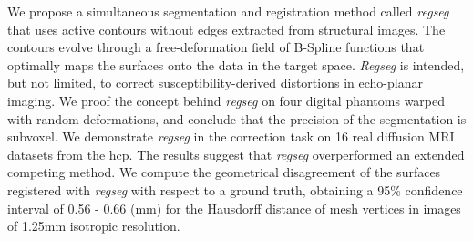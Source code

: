 We propose a simultaneous segmentation and registration method called \emph{regseg}
  that uses active contours without edges extracted from structural images.
The contours evolve through a free-deformation field of B-Spline functions that
  optimally maps the surfaces onto the data in the target space.
\emph{Regseg} is intended, but not limited, to correct susceptibility-derived distortions
  in echo-planar imaging.
We proof the concept behind \emph{regseg} on four digital phantoms warped with random
  deformations, and conclude that the precision of the segmentation is subvoxel.
We demonstrate \emph{regseg} in the correction task on 16 real diffusion MRI
  datasets from the \acrlong*{hcp}.
The results suggest that \emph{regseg} overperformed an extended competing method.
We compute the geometrical disagreement of the surfaces registered with \emph{regseg} with
  respect to a ground truth, obtaining a 95\% confidence interval of 0.56 - 0.66 (mm)
  for the Hausdorff distance of mesh vertices in images of 1.25mm isotropic resolution.

